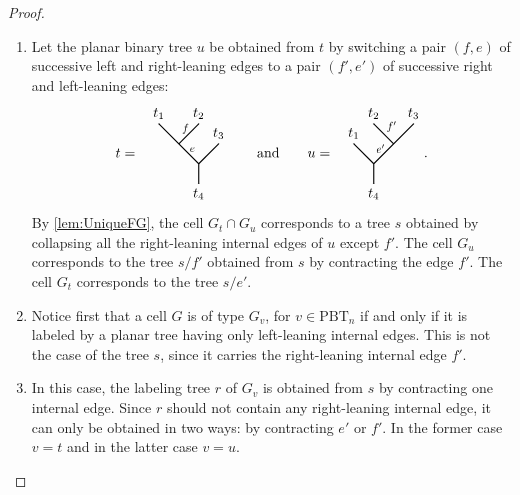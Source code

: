 \documentclass[11pt]{article}
\newcommand{\skpt}{\smallskip}
\numberwithin{equation}{section}\providecommand{\No}{}
\theoremstyle{plain}
\theoremstyle{definition}
\newcommand{\Tam}[1]{\mathrm{PBT}_{#1}}
\begin{document}
\skpt
\begin{proof}
\begin{enumerate}
\item Let the planar binary tree $u$ be obtained from $t$ by switching
a pair $(f,e)$ of successive left and right-leaning edges
to a pair $(f', e')$ of successive
right and left-leaning edges:
\[
t=\ {\vcenter{\hbox{
\begin{tikzpicture}[yscale=0.5,xscale=0.5]
\draw[thick] (0,-1)--(0,0) -- (-2,2);
\draw[thick] (-1,1)--(0,2) ;
\draw[thick] (0,0)--(1,1) ;
\draw [fill] (0,-1) circle [radius=0.014];
\draw [fill] (-2,2) circle [radius=0.014];
\draw [fill] (1,1) circle [radius=0.014];
\draw [fill] (0,2) circle [radius=0.014];

\draw (-2,2) node[above] {$t_1$};
\draw (0,2) node[above] {$t_2$};
\draw (1,1) node[above] {$t_3$};
\draw (0,-1) node[below] {$t_4$};
\draw (-0.7,0.35) node[above right] {\scalebox{0.8}{$e$}};
\draw (-0.25,1.25) node[above left] {\scalebox{0.8}{$f$}};
\end{tikzpicture}}}}
\qquad \text{and} \qquad
u=\ {\vcenter{\hbox{
\begin{tikzpicture}[yscale=0.5,xscale=0.5]
\draw[thick] (0,-1)--(0,0) -- (2,2);
\draw[thick] (1,1)--(0,2) ;
\draw[thick] (0,0)--(-1,1) ;
\draw [fill] (0,-1) circle [radius=0.014];
\draw [fill] (2,2) circle [radius=0.014];
\draw [fill] (-1,1) circle [radius=0.014];
\draw [fill] (0,2) circle [radius=0.014];

\draw (2,2) node[above] {$t_3$};
\draw (0,2) node[above] {$t_2$};
\draw (-1,1) node[above] {$t_1$};
\draw (0,-1) node[below] {$t_4$};
\draw (0.8,0.3) node[above left] {\scalebox{0.8}{$e'$}};
\draw (0.4,1.35) node[above right] {\scalebox{0.8}{$f'$}};
\end{tikzpicture}}}}.
\]
By \cref{lem:UniqueFG}, the cell $G_t\cap G_u$ corresponds to a tree $s$ obtained by collapsing all the right-leaning internal edges of $u$ except $f'$.
The cell $G_u$ corresponds to the tree
$s / f'$ obtained from $s$ by contracting the edge $f'$.
The cell $G_t$ corresponds to the tree $s/ e'$.

\item Notice first that a cell $G$ is of type $G_v$, for $v\in \Tam{n}$ if and only if it is labeled by a planar tree
having only left-leaning internal edges.
This is not the case of the tree $s$, since it carries the right-leaning internal edge $f'$.

\item In this case, the labeling tree $r$ of $G_v$ is obtained from $s$ by contracting one internal edge. Since $r$ should not contain any right-leaning internal edge, it can only be obtained in two ways: by contracting $e'$ or $f'$. In the former case $v=t$ and in the latter case $v=u$.\qedhere
\end{enumerate}
\end{proof}
\end{document}
